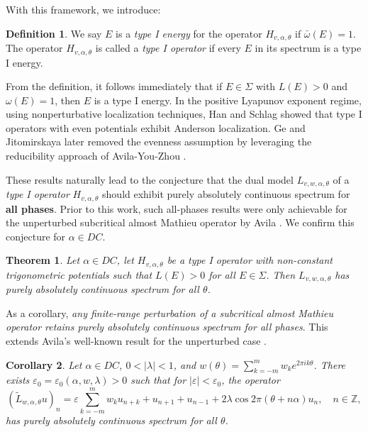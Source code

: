 \documentclass[11pt]{amsart}
\newtheorem{theorem}{Theorem}[section]
\newtheorem{coro}[theorem]{Corollary}
\theoremstyle{remark}
\theoremstyle{definition}
\newtheorem{definition}{Definition}
\begin{document}
With this framework, we introduce:
\begin{definition}\label{typei}\cite{GJY}
We say \( E \) is a {\it type I energy} for the operator \( H_{v,\alpha,\theta} \) if \( \bar{\omega}(E) = 1 \). The operator \( H_{v,\alpha,\theta} \) is called a {\it type I operator} if every \( E \) in its spectrum is a type I energy.
\end{definition}
 
From the definition, it follows immediately that if \( E \in \Sigma \) with \( L(E) > 0 \) and \( \omega(E) = 1 \), then \( E \) is a type I energy. In the positive Lyapunov exponent regime, using nonperturbative localization techniques, Han and Schlag \cite{hs,HS} showed that type I operators with even potentials exhibit Anderson localization. Ge and Jitomirskaya \cite{GJ} later removed the evenness assumption by leveraging the reducibility approach of Avila-You-Zhou \cite{AYZ}.
 
These results naturally lead to the conjecture that the dual model \( L_{v,w,\alpha,\theta} \)  of a {\it type I operator} \( H_{v,\alpha,\theta} \) should exhibit purely absolutely continuous spectrum for \textbf{all phases}. Prior to this work, such all-phases results were only achievable for the unperturbed subcritical almost Mathieu operator by Avila \cite{Avila: ac}. We confirm this conjecture for $\alpha\in DC$.
 
\begin{theorem}\label{type1ac}
Let \( \alpha \in DC \), let \( H_{v,\alpha,\theta} \) be a {\it type I operator} with non-constant trigonometric potentials such that \( L(E) > 0 \) for all \( E \in \Sigma \). Then \( L_{v,w,\alpha,\theta} \) has purely absolutely continuous spectrum for all \( \theta \).
\end{theorem}


As a corollary, \textit{any finite-range perturbation of a subcritical almost Mathieu operator retains purely absolutely continuous spectrum for all phases}. This extends Avila's well-known result for the unperturbed case \cite{Avila: ac}.


\begin{coro}\label{pamo}
Let \( \alpha \in DC \), \( 0 < |\lambda| < 1 \), and \( w(\theta) = \sum_{k=-m}^m w_k e^{2\pi i k\theta} \). There exists \( \varepsilon_0 = \varepsilon_0(\alpha, w, \lambda) > 0 \) such that for \( |\varepsilon| < \varepsilon_0 \), the operator
\begin{equation}\label{long-range-qp-1}
(\tilde{L}_{w,\alpha,\theta}u)_n = \varepsilon \sum_{k=-m}^m w_k u_{n+k}+u_{n+1}+u_{n-1} + 2\lambda\cos 2\pi(\theta + n\alpha)u_n, \quad n \in \mathbb{Z},
\end{equation}
has purely absolutely continuous spectrum for all \( \theta \).
\end{coro}
\end{document}
